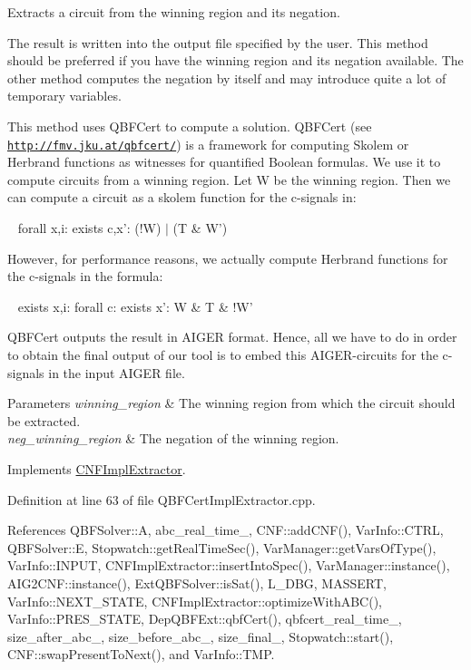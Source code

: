 Extracts a circuit from the winning region and its negation. 

The result is written into the output file specified by the user. This method should be preferred if you have the winning region and its negation available. The other method computes the negation by itself and may introduce quite a lot of temporary variables.

This method uses Q\-B\-F\-Cert to compute a solution. Q\-B\-F\-Cert (see \href{http://fmv.jku.at/qbfcert/}{\tt http\-://fmv.\-jku.\-at/qbfcert/}) is a framework for computing Skolem or Herbrand functions as witnesses for quantified Boolean formulas. We use it to compute circuits from a winning region. Let W be the winning region. Then we can compute a circuit as a skolem function for the c-\/signals in\-: \par
 ~ forall x,i\-: exists c,x'\-: (!\-W) $|$ (T \& W') \par
 However, for performance reasons, we actually compute Herbrand functions for the c-\/signals in the formula\-: \par
 ~ exists x,i\-: forall c\-: exists x'\-: W \& T \& !\-W' \par
 Q\-B\-F\-Cert outputs the result in A\-I\-G\-E\-R format. Hence, all we have to do in order to obtain the final output of our tool is to embed this A\-I\-G\-E\-R-\/circuits for the c-\/signals in the input A\-I\-G\-E\-R file.


\begin{DoxyParams}{Parameters}
{\em winning\-\_\-region} & The winning region from which the circuit should be extracted. \\
\hline
{\em neg\-\_\-winning\-\_\-region} & The negation of the winning region. \\
\hline
\end{DoxyParams}


Implements \hyperlink{classCNFImplExtractor_a8251ce58869f9f8ded159f1fa07ab334}{C\-N\-F\-Impl\-Extractor}.



Definition at line 63 of file Q\-B\-F\-Cert\-Impl\-Extractor.\-cpp.



References Q\-B\-F\-Solver\-::\-A, abc\-\_\-real\-\_\-time\-\_\-, C\-N\-F\-::add\-C\-N\-F(), Var\-Info\-::\-C\-T\-R\-L, Q\-B\-F\-Solver\-::\-E, Stopwatch\-::get\-Real\-Time\-Sec(), Var\-Manager\-::get\-Vars\-Of\-Type(), Var\-Info\-::\-I\-N\-P\-U\-T, C\-N\-F\-Impl\-Extractor\-::insert\-Into\-Spec(), Var\-Manager\-::instance(), A\-I\-G2\-C\-N\-F\-::instance(), Ext\-Q\-B\-F\-Solver\-::is\-Sat(), L\-\_\-\-D\-B\-G, M\-A\-S\-S\-E\-R\-T, Var\-Info\-::\-N\-E\-X\-T\-\_\-\-S\-T\-A\-T\-E, C\-N\-F\-Impl\-Extractor\-::optimize\-With\-A\-B\-C(), Var\-Info\-::\-P\-R\-E\-S\-\_\-\-S\-T\-A\-T\-E, Dep\-Q\-B\-F\-Ext\-::qbf\-Cert(), qbfcert\-\_\-real\-\_\-time\-\_\-, size\-\_\-after\-\_\-abc\-\_\-, size\-\_\-before\-\_\-abc\-\_\-, size\-\_\-final\-\_\-, Stopwatch\-::start(), C\-N\-F\-::swap\-Present\-To\-Next(), and Var\-Info\-::\-T\-M\-P.



